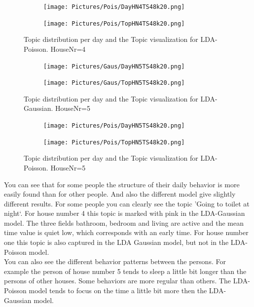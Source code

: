 \documentclass[11pt,a4paper]{article}
\begin{document}
\begin{figure}
 \centering
 \begin{subfigure}[b]{0.45\linewidth}
  \centering
  \texttt{[image: Pictures/Pois/DayHN4TS48k20.png]}
 \end{subfigure}
 \begin{subfigure}[b]{0.45\linewidth}
  \centering
  \texttt{[image: Pictures/Pois/TopHN4TS48k20.png]}
 \end{subfigure}
 \caption{Topic distribution per day and the Topic visualization for LDA-Poisson. HouseNr=4}
\end{figure}

\begin{figure}
 \centering
 \begin{subfigure}[b]{0.45\linewidth}
  \centering
  \texttt{[image: Pictures/Gaus/DayHN5TS48k20.png]}
 \end{subfigure}
 \begin{subfigure}[b]{0.45\linewidth}
  \centering
  \texttt{[image: Pictures/Gaus/TopHN5TS48k20.png]}
 \end{subfigure}
 \caption{Topic distribution per day and the Topic visualization for LDA-Gaussian. HouseNr=5}
\end{figure}

\begin{figure}
 \centering
 \begin{subfigure}[b]{0.45\linewidth}
  \centering
  \texttt{[image: Pictures/Pois/DayHN5TS48k20.png]}
 \end{subfigure}
 \begin{subfigure}[b]{0.45\linewidth}
  \centering
  \texttt{[image: Pictures/Pois/TopHN5TS48k20.png]}
 \end{subfigure}
 \caption{Topic distribution per day and the Topic visualization for LDA-Poisson. HouseNr=5}
\end{figure}

You can see that for some people the structure of their daily behavior is more easily found than for other people. And also the different model give slightly different results.
For some people you can clearly see the topic 'Going to toilet at night`. For house number 4 this topic is marked with pink in the LDA-Gaussian model. The three fields bathroom, bedroom and living are active and the mean time value is quiet low, which corresponds with an early time. For house number one this topic is also captured in the LDA Gaussian model, but not in the LDA-Poisson model.\\
You can also see the different behavior patterns between the persons. For example the person of house number 5 tends to sleep a little bit longer than the persons of other houses. Some behaviors are more regular than others.
The LDA-Poisson model tends to focus on the time a little bit more then the LDA-Gaussian model.
\end{document}
